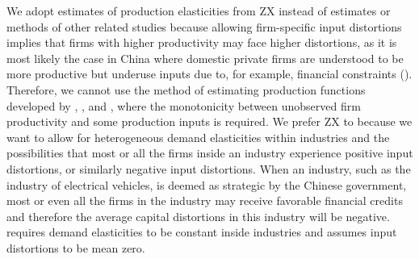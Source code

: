 \documentclass[12pt]{article}
\begin{document}

We adopt estimates of production elasticities from ZX instead of estimates or methods of other related studies because allowing firm-specific input distortions implies that firms with higher productivity may face higher distortions, as it is most likely the case in China where domestic private firms are understood to be more productive but underuse inputs due to, for example, financial constraints (\citet{songGrowingChina2011}). Therefore, we cannot use the method of estimating production functions developed by \citet{olleyDynamicsProductivityTelecommunications1996}, \citet{levinsohnEstimatingProductionFunctions2003}, and \citet{ackerberg_identification_2015}, where the monotonicity between unobserved firm productivity and some production inputs is required. We prefer ZX to \citet{ruzicReturnsScaleProductivity2021} because we want to allow for heterogeneous demand elasticities within industries and the possibilities that most or all the firms inside an industry experience positive input distortions, or similarly negative input distortions. When an industry, such as the industry of electrical vehicles, is deemed as strategic by the Chinese government, most or even all the firms in the industry may receive favorable financial credits and therefore the average capital distortions in this industry will be negative. \citet{ruzicReturnsScaleProductivity2021} requires demand elasticities to be constant inside industries and assumes input distortions to be mean zero. 

\end{document}
